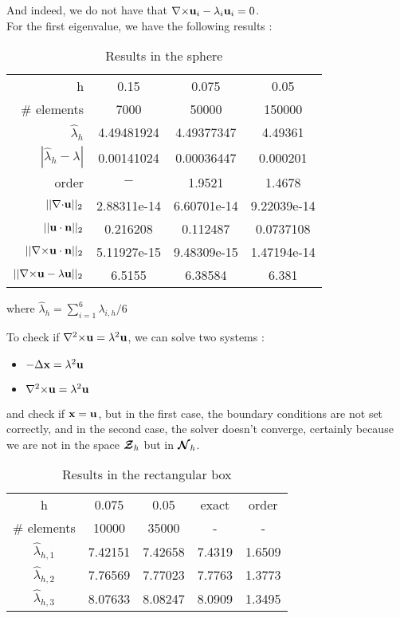 And indeed, we do not have that ${\nabla\times}{\mathbf{u}}_i-\lambda_i{\mathbf{u}}_i = 0$.\\
For the first eigenvalue, we have the following results :
\begin{table}[H]
  \centering
  \begin{tabular}{r|c|c|c}
    h & 0.15 & 0.075 & 0.05 \\
    \# elements & 7000 & 50000 & 150000 \\
    \hline
    $\widehat{\lambda}_h$ & 4.49481924 & 4.49377347 & 4.49361\\
    $|\widehat{\lambda}_h-\lambda|$ & 0.00141024 & 0.00036447 & 0.000201 \\
    order & $-$ & 1.9521 & 1.4678 \\
    \hline
    $||{\nabla\cdot}{\mathbf{u}}||_2$ & 2.88311e-14 & 6.60701e-14 & 9.22039e-14 \\
    $||{\mathbf{u}}\cdot{\mathbf{n}}||_2$ & 0.216208 & 0.112487 & 0.0737108 \\
    $||{\nabla\times}{\mathbf{u}}\cdot{\mathbf{n}}||_2$ & 5.11927e-15 & 9.48309e-15 & 1.47194e-14 \\
    $||{\nabla\times}{\mathbf{u}}-\lambda{\mathbf{u}}||_2$ & 6.5155 & 6.38584 & 6.381
  \end{tabular}
  \caption{Results in the sphere}
\end{table}
where $\widehat{\lambda}_h=\sum_{i=1}^6\lambda_{i,h}/6$
\begin{rk}\label{curll}
  To check if ${\nabla^2\times}{\mathbf{u}}=\lambda^2{\mathbf{u}}$, we can solve two systems :
  \begin{itemize}
  \item $-{\Delta}{\mathbf{x}}=\lambda^2{\mathbf{u}}$
  \item ${\nabla^2\times}{\mathbf{u}}=\lambda^2{\mathbf{u}}$
  \end{itemize}
  and check if ${\mathbf{x}}={\mathbf{u}}$, but in the first case, the boundary conditions are not set correctly, and in the second case, the solver doesn't converge, certainly because we are not in the space ${\bm{\mathcal{Z}}}_h$ but in ${\bm{\mathcal{N}}}_h$.
\end{rk}

\begin{table}[H]
  \centering
  \begin{tabular}{c|cc|c|c}
    h & 0.075 & 0.05 & exact & order \\
    \# elements & 10000 & 35000 & - & - \\
    \hline
    $\widehat{\lambda}_{h,1}$ & 7.42151 & 7.42658 & 7.4319 & 1.6509 \\
    $\widehat{\lambda}_{h,2}$ & 7.76569 & 7.77023 & 7.7763 & 1.3773 \\
    $\widehat{\lambda}_{h,3}$ & 8.07633 &  8.08247 & 8.0909 & 1.3495
  \end{tabular}
  \caption{Results in the rectangular box}
\end{table}

